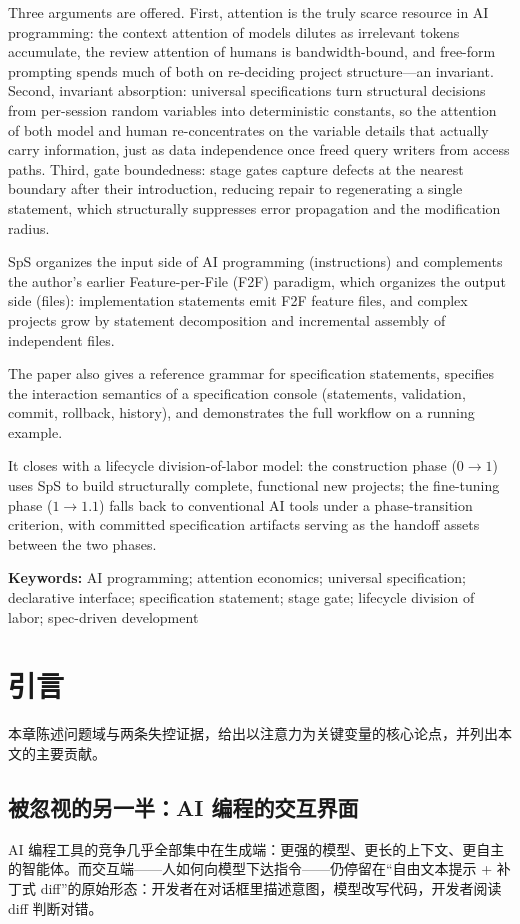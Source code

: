 \documentclass[11pt,a4paper]{ctexart}
\begin{document}
Three arguments are offered. First, attention is the truly scarce resource in AI programming: the context attention of models dilutes as irrelevant tokens accumulate, the review attention of humans is bandwidth-bound, and free-form prompting spends much of both on re-deciding project structure---an invariant. Second, invariant absorption: universal specifications turn structural decisions from per-session random variables into deterministic constants, so the attention of both model and human re-concentrates on the variable details that actually carry information, just as data independence once freed query writers from access paths. Third, gate boundedness: stage gates capture defects at the nearest boundary after their introduction, reducing repair to regenerating a single statement, which structurally suppresses error propagation and the modification radius.

SpS organizes the input side of AI programming (instructions) and complements the author's earlier Feature-per-File (F2F) paradigm, which organizes the output side (files): implementation statements emit F2F feature files, and complex projects grow by statement decomposition and incremental assembly of independent files.

The paper also gives a reference grammar for specification statements, specifies the interaction semantics of a specification console (statements, validation, commit, rollback, history), and demonstrates the full workflow on a running example.

It closes with a lifecycle division-of-labor model: the construction phase ($0\to1$) uses SpS to build structurally complete, functional new projects; the fine-tuning phase ($1\to1.1$) falls back to conventional AI tools under a phase-transition criterion, with committed specification artifacts serving as the handoff assets between the two phases.

\noindent\textbf{Keywords:} AI programming; attention economics; universal specification; declarative interface; specification statement; stage gate; lifecycle division of labor; spec-driven development

\clearpage

\section{引言}
本章陈述问题域与两条失控证据，给出以注意力为关键变量的核心论点，并列出本文的主要贡献。

\subsection{被忽视的另一半：AI 编程的交互界面}
AI 编程工具的竞争几乎全部集中在生成端：更强的模型、更长的上下文、更自主的智能体\cite{ref1,ref14,ref15}。而交互端——人如何向模型下达指令——仍停留在“自由文本提示 + 补丁式 diff”的原始形态：开发者在对话框里描述意图，模型改写代码，开发者阅读 diff 判断对错。
\end{document}
